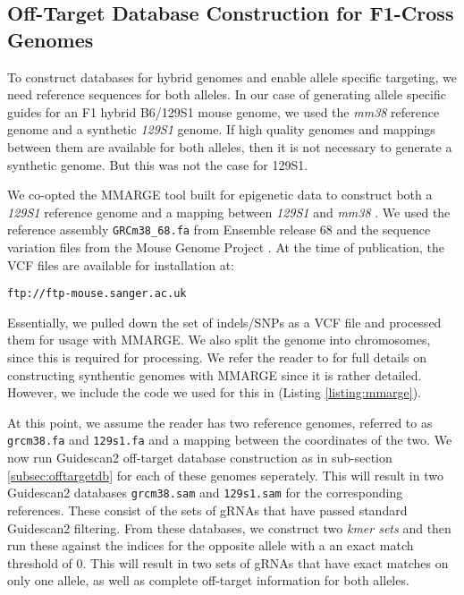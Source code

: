 \documentclass[11pt]{article}
\begin{document}
\subsection{Off-Target Database Construction for F1-Cross Genomes}

To construct databases for hybrid genomes and enable allele specific
targeting, we need reference sequences for both alleles.  In our case
of generating allele specific guides for an F1 hybrid B6/129S1 mouse
genome, we used the \textit{mm38} reference genome and a synthetic
\textit{129S1} genome. If high quality genomes and mappings between them are
available for both alleles, then it is not necessary to generate a
synthetic genome. But this was not the case for 129S1.

We co-opted the MMARGE tool built for epigenetic data to construct
both a \textit{129S1} reference genome and a mapping between
\textit{129S1} and \textit{mm38} \parencite{link2018mmarge}. We used
the reference assembly \texttt{GRCm38\_68.fa} from Ensemble release 68
and the sequence variation files from the Mouse Genome Project
\parencite{keane2011mouse}. At the time of publication, the VCF files
are available for installation at:

\begin{center}
  \texttt{ftp://ftp-mouse.sanger.ac.uk}
\end{center}

Essentially, we pulled down the set of indels/SNPs as a VCF file and
processed them for usage with MMARGE. We also split the genome into
chromosomes, since this is required for processing. We refer the
reader to \parencite{link2018mmarge} for full details on constructing
synthentic genomes with MMARGE since it is rather detailed. However,
we include the code we used for this in (Listing
\ref{listing:mmarge}).

At this point, we assume the reader has two reference genomes,
referred to as \texttt{grcm38.fa} and \texttt{129s1.fa} and a mapping
between the coordinates of the two. We now run Guidescan2 off-target
database construction as in sub-section \ref{subsec:offtargetdb} for
each of these genomes seperately. This will result in two Guidescan2
databases \texttt{grcm38.sam} and \texttt{129s1.sam} for the
corresponding references. These consist of the sets of gRNAs that have
passed standard Guidescan2 filtering. From these databases, we
construct two {\it kmer sets} and then run these against the indices
for the opposite allele with a an exact match threshold of 0. This
will result in two sets of gRNAs that have exact matches on only one
allele, as well as complete off-target information for both alleles.
\end{document}
